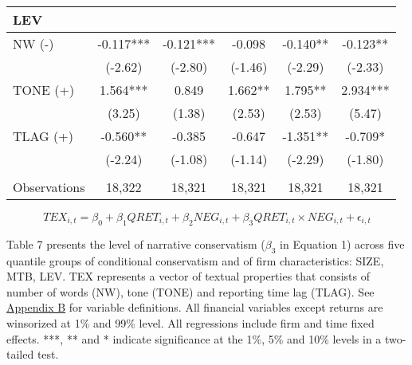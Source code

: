 \begin{table}[H]
\begin{center}
\begin{tabular}{lccccc}
			\midrule
			LEV &   &   &   &   &  \\
			\midrule
			NW (-) & -0.117*** & -0.121*** & -0.098 & -0.140** & -0.123** \\
			& (-2.62) & (-2.80) & (-1.46) & (-2.29) & (-2.33) \\
			TONE (+) & 1.564*** & 0.849 & 1.662** & 1.795** & 2.934*** \\
			& (3.25) & (1.38) & (2.53) & (2.53) & (5.47) \\
			TLAG (+) & -0.560** & -0.385 & -0.647 & -1.351** & -0.709* \\
			& (-2.24) & (-1.08) & (-1.14) & (-2.29) & (-1.80) \\
			&   &   &   &   &  \\
			Observations & 18,322 & 18,321 & 18,321 & 18,321 & 18,321 \\
			\bottomrule
			\bottomrule
		\end{tabular}%
	\end{center}
		\begin{footnotesize}
			\setcounter{equation}{0}
			\begin{equation}
				TEX_{i,t}=\beta_0+\beta_1QRET_{i,t}+\beta_2NEG_{i,t}+\beta_3QRET_{i,t}\times NEG_{i,t}+\epsilon_{i,t}
			\end{equation}
			
			\noindent Table 7 presents the level of narrative conservatism ($\beta_3$ in Equation 1) across five quantile groups of conditional conservatism and of firm characteristics: SIZE, MTB, LEV. TEX represents a vector of textual properties that consists of number of words (NW), tone (TONE) and reporting time lag (TLAG). See \hyperref[appb]{Appendix B} for variable definitions. All financial variables except returns are winsorized at 1\% and 99\% level. All regressions include firm and time fixed effects. ***, ** and * indicate significance at the 1\%, 5\% and 10\% levels in a two-tailed test.
		\end{footnotesize}
\end{table}%
